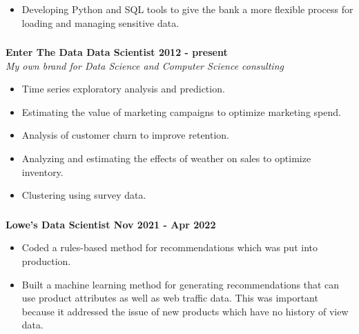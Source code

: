 \documentclass[
]{article}
\providecommand{\tightlist}{%
  \setlength{\itemsep}{0pt}\setlength{\parskip}{0pt}}
\begin{document}
\begin{itemize}
\tightlist
\item Developing Python and SQL tools to give the bank a more flexible process for loading and managing sensitive data.
\end{itemize}

\vspace{-18pt}
{\subsubsection{} \label{enterthedata}}
{\textbf {Enter The Data \hfill  Data Scientist \hfill 2012 - present}}\\
\emph {My own brand for Data Science and Computer Science consulting}

\begin{itemize}
\tightlist
\item  Time series exploratory analysis and prediction.
\item Estimating the value of marketing campaigns to optimize marketing spend.
\item
  Analysis of customer churn to improve retention.
\item
  Analyzing and estimating the effects of weather on sales to optimize inventory.
\item Clustering using survey data.
\end{itemize}

\vspace{-18pt}
\hypertarget{lowes}
{\subsubsection{} \label{lowes}}

\textbf {Lowe's \hfill Data Scientist \hfill Nov 2021 - Apr 2022}\\
\vspace{-10pt}
\begin{itemize}
\tightlist
\item
  Coded a rules-based method for recommendations which was put into 
   production.
   
 \item  Built a machine learning
  method for generating recommendations that can use product attributes as well as web traffic data.  This was important because
  it addressed the issue of new products which have no 
    history of view data. 
\end{itemize}


\pagebreak
\end{document}
